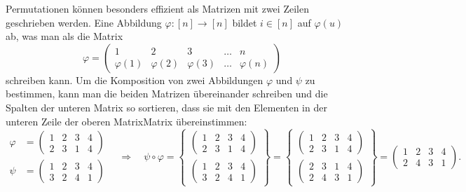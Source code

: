 Permutationen können besonders effizient als Matrizen mit zwei Zeilen
geschrieben werden.
Eine Abbildung $\varphi\colon [n]\to[n]$ bildet $i\in [n]$ auf $\varphi(u)$
ab, was man als die Matrix
\[
\varphi
=
\begin{pmatrix}
1&2&3&\dots&n\\
\varphi(1)&\varphi(2)&\varphi(3)&\dots&\varphi(n)
\end{pmatrix}
\]
schreiben kann.
Um die Komposition von zwei Abbildungen $\varphi$ und $\psi$ zu bestimmen,
kann man die beiden Matrizen übereinander schreiben und die Spalten der
unteren Matrix so sortieren, dass sie mit den Elementen in der unteren
Zeile der oberen MatrixMatrix  übereinstimmen:
\[
\begin{aligned}
\varphi
&=
\begin{pmatrix}1&2&3&4\\2&3&1&4\end{pmatrix}
\\
\psi
&=
\begin{pmatrix}1&2&3&4\\3&2&4&1\end{pmatrix}
\end{aligned}
\quad\Rightarrow\quad
\psi\circ \varphi
=
\left\{
\begin{array}{c}
\displaystyle\begin{pmatrix}1&2&3&4\\2&3&1&4\end{pmatrix}\\
\displaystyle\begin{pmatrix}1&2&3&4\\3&2&4&1\end{pmatrix}
\end{array}
\right\}
=
\left\{
\begin{array}{c}
\displaystyle\begin{pmatrix}1&2&3&4\\2&3&1&4\end{pmatrix}\\
\displaystyle\begin{pmatrix}2&3&1&4\\2&4&3&1\end{pmatrix}
\end{array}
\right\}
=
\begin{pmatrix}
1&2&3&4\\
2&4&3&1
\end{pmatrix}.
\]

